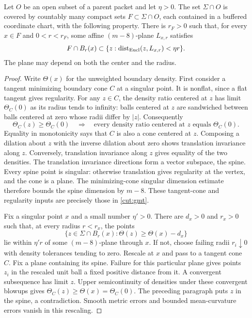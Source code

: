 \begin{lemma}\label{local:flat-pieces}
Let $O$ be an open subset of a parent packet and let $\eta>0$.
The set $\Sigma\cap O$ is covered by countably many compact sets
$F\subset\Sigma\cap O$, each contained in a buffered coordinate chart,
with the following property.  There is $r_F>0$ such that, for every
$x\in F$ and $0<r<r_F$, some affine $(m-8)$-plane $L_{x,r}$ satisfies
\begin{equation}\label{local:flatness}
 F\cap B_r(x)\subset\{z:\operatorname{dist}_{\rm Eucl}(z,L_{x,r})<\eta r\}.
\end{equation}
The plane may depend on both the center and the radius.
\end{lemma}
\begin{proof}
Write $\Theta(x)$ for the unweighted boundary density.  First consider
a tangent minimizing boundary cone $C$ at a singular point.  It is
nonflat, since a flat tangent gives regularity.  For any $z\in C$, the
density ratio centered at $z$ has limit $\Theta_C(0)$ as its radius
tends to infinity: balls centered at $z$ are sandwiched between balls
centered at zero whose radii differ by $|z|$.  Consequently
\[
 \Theta_C(z)\ge\Theta_C(0)
 \quad\Longrightarrow\quad
 \text{every density ratio centered at $z$ equals $\Theta_C(0)$}.
\]
Equality in monotonicity says that $C$ is also a cone centered at $z$.
Composing a dilation about $z$ with the inverse dilation about zero
shows translation invariance along $z$.  Conversely, translation
invariance along $z$ gives equality of the two densities.  The
translation invariance directions form a vector subspace, the spine.
Every spine point is singular: otherwise translation gives regularity
at the vertex, and the cone is a plane.  The minimizing-cone singular
dimension estimate therefore bounds the spine dimension by $m-8$.
These tangent-cone and regularity inputs are precisely those in
\cref{cut:gmt}.

Fix a singular point $x$ and a small number $\eta'>0$.  There are
$d_x>0$ and $r_x>0$ such that, at every radius $r<r_x$, the points
\begin{equation}\label{local:high-density}
 \{z\in\Sigma\cap B_r(x):\Theta(z)\ge\Theta(x)-d_x\}
\end{equation}
lie within $\eta'r$ of some $(m-8)$-plane through $x$.  If not, choose
failing radii $r_i\downarrow0$ with density tolerances tending to zero.
Rescale at $x$ and pass to a tangent cone $C$.  Fix a plane containing
its spine.  Failure for this particular plane gives points $z_i$ in
the rescaled unit ball a fixed positive distance from it.  A convergent
subsequence has limit $z$.  Upper semicontinuity of densities under
these convergent blowups gives
$\Theta_C(z)\ge\Theta(x)=\Theta_C(0)$.  The preceding paragraph puts
$z$ in the spine, a contradiction.  Smooth metric errors and bounded
mean-curvature errors vanish in this rescaling.


\end{proof}

